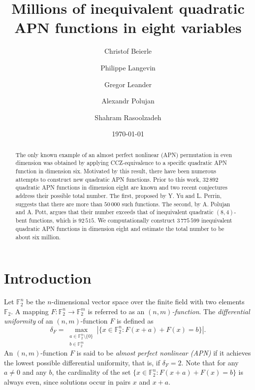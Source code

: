 \documentclass{amsart}[11pt]
\title[Millions of inequivalent APN functions]{Millions of inequivalent quadratic APN functions in eight variables}
\author[C. Beierle]{Christof Beierle}
\author[P. Langevin]{Philippe Langevin}
\author[G. Leander]{Gregor Leander}
\author[A. Polujan]{Alexandr Polujan}
\author[S. Rasoolzadeh]{Shahram Rasoolzadeh}
\date{\today}
\theoremstyle{plain}
\theoremstyle{definition}
\numberwithin{theorem}{section}
\numberwithin{equation}{section}
\numberwithin{table}{section}
\numberwithin{figure}{section}
\numberwithin{algorithm}{section}
\def\F{\mathbb F}
\begin{document}
\begin{abstract}
The only known example of an almost perfect nonlinear (APN) permutation in even dimension was obtained by applying CCZ-equivalence to a specific quadratic APN function in dimension six. Motivated by this result, there have been numerous attempts to construct new quadratic APN functions. Prior to this work, $32\,892$ quadratic APN functions in dimension eight are known and two recent conjectures address their possible total number. The first, proposed by Y. Yu and L. Perrin, suggests that there are more than $50\,000$ such functions. The second, by A. Polujan and A. Pott, argues that their number exceeds that of inequivalent quadratic $(8,4)$-bent functions, which is $92\,515$. We computationally construct $3\,775\,599$  inequivalent quadratic APN functions in dimension eight and estimate the total number to be about six million.
\end{abstract}


\maketitle
\section{Introduction}

Let $\F_2^n$ be the $n$-dimensional vector space over the finite field with two elements $\F_2$. A mapping $F\colon \F_2^n \to \F_2^m$ is referred to as an \emph{$(n,m)$-function}. The \emph{differential uniformity} of an $(n,m)$-function $F$ is defined as
\begin{equation}\label{def:diff_uniformity}
	\delta_F = \max_{\substack{a \in \mathbb{F}_2^n \setminus \{0\} \\ b \in \mathbb{F}_2^m}} \left|\{x \in \mathbb{F}_2^n \colon F(x+a) + F(x) = b\}\right|.
\end{equation}
An $(n,m)$-function $F$ is said to be \emph{almost perfect nonlinear (APN)} if it achieves the lowest possible differential uniformity, that is, if $\delta_F = 2$. Note that for any $a \neq 0$ and any $b$, the cardinality of the set $\{x \in \F_2^n \colon F(x+a) + F(x) = b\}$ is always even, since solutions occur in pairs $x$ and $x+a$.
\end{document}
